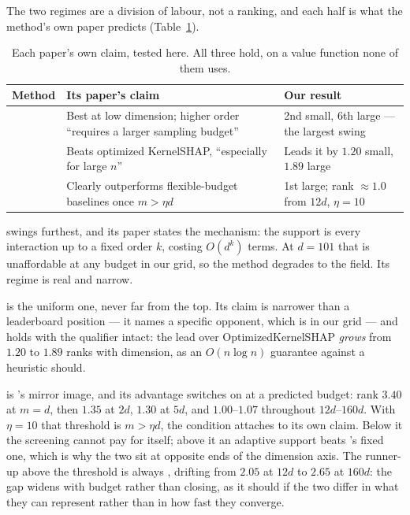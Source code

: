The two regimes are a division of labour, not a ranking, and each half is what the method's own
paper predicts (Table~\ref{tab:benchmark:claims}).

\begin{table}[H]
    \centering
    \caption[Each paper's claim against our result]{Each paper's own claim, tested here. All
        three hold, on a value function none of them uses.}
    \label{tab:benchmark:claims}
    \begin{tabular}{@{}p{}p{}p{}@{}}
        \toprule
        Method & Its paper's claim & Our result \\
        \midrule
        \polyshap{} & Best at low dimension; higher order ``requires a larger sampling
            budget'' \citep{Fumagalli.2026a} & 2nd small, 6th large --- the largest swing \\
        \leverageshap{} & Beats optimized KernelSHAP, ``especially for large $n$''
            \citep{Witter.2025a} & Leads it by $1.20$ small, $1.89$ large \\
        \oddshap{} & Clearly outperforms flexible-budget baselines once $m > \eta d$
            \citep{Fumagalli.2026} & 1st large; rank $\approx 1.0$ from $12d$, $\eta = 10$ \\
        \bottomrule
    \end{tabular}
\end{table}

\polyshap{} swings furthest, and its paper states the mechanism: the support is every interaction
up to a fixed order $k$, costing $O(d^k)$ terms. At $d = 101$ that is unaffordable at any budget
in our grid, so the method degrades to the field. Its regime is real and narrow.

\leverageshap{} is the uniform one, never far from the top. Its claim is narrower than a
leaderboard position --- it names a specific opponent, which is in our grid --- and holds with the
qualifier intact: the lead over OptimizedKernelSHAP \emph{grows} from $1.20$ to $1.89$ ranks with
dimension, as an $O(n \log n)$ guarantee against a heuristic should.

\oddshap{} is \polyshap{}'s mirror image, and its advantage switches on at a predicted budget:
rank $3.40$ at $m = d$, then $1.35$ at $2d$, $1.30$ at $5d$, and $1.00$–$1.07$ throughout
$12d$–$160d$. With $\eta = 10$ that threshold is $m > \eta d$, the condition
\citet{Fumagalli.2026} attaches to its own claim. Below it the screening cannot pay for itself;
above it an adaptive support beats \polyshap{}'s fixed one, which is why the two sit at opposite
ends of the dimension axis. The runner-up above the threshold is always \leverageshap{}, drifting
from $2.05$ at $12d$ to $2.65$ at $160d$: the gap widens with budget rather than closing, as it
should if the two differ in what they can represent rather than in how fast they converge.

